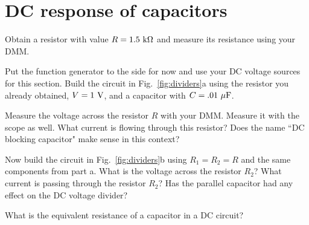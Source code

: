 \documentclass[12pt]{article}
\begin{document}
\section{DC response of capacitors}

Obtain a resistor with value $R=1.5~\rm k\Omega$ and measure its resistance using your DMM.

Put the function generator to the side for now and use your DC voltage sources for this section.
Build the circuit in Fig.~\ref{fig:dividers}a using the resistor you already obtained, $V=1 ~\rm V$, and a capacitor with $C=.01~\rm\mu F$.

Measure the voltage across the resistor $R$ with your DMM.  Measure it with the scope as well.  What current is flowing through this resistor?  Does the name ``DC blocking capacitor" make sense in this context?

Now build the circuit in Fig.~\ref{fig:dividers}b using $R_1=R_2=R$ and the same components from part a.  What is the voltage across the resistor $R_2$?  What current is passing through the resistor $R_2$?   
Has the parallel capacitor had any effect on the DC voltage divider?

What is the equivalent resistance of a capacitor in a DC circuit?
\end{document}
